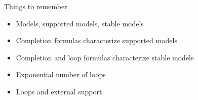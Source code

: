 \begin{frame}{Things to remember}
  \bigskip
  \begin{itemize}
  \item Models, supported models, stable models
    \smallskip
  \item Completion formulas characterize supported models
  \item Completion and loop formulas characterize stable models
    \smallskip
  \item Exponential number of loops
  \item Loops and external support
  \end{itemize}
\end{frame}
%

